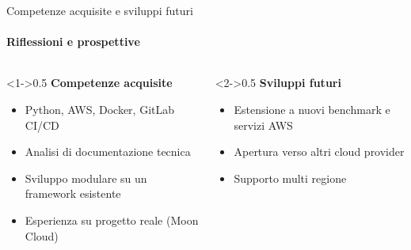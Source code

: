 \documentclass{beamer}
\begin{document}
\begin{frame}{Competenze acquisite e sviluppi futuri}
    \framesubtitle{Riflessioni e prospettive}
    \begin{columns}
        \begin{column}<1->{0.5\textwidth}
            \textbf{Competenze acquisite}
            \begin{itemize}
                \item Python, AWS, Docker, GitLab CI/CD                \item Analisi di documentazione tecnica
                \item Sviluppo modulare su un framework esistente
                \item Esperienza su progetto reale (Moon Cloud)
            \end{itemize}
        \end{column}
        \begin{column}<2->{0.5\textwidth}
            \textbf{Sviluppi futuri}
            \begin{itemize}
                \item Estensione a nuovi benchmark e servizi AWS
                \item Apertura verso altri cloud provider
                \item Supporto multi regione
            \end{itemize}
        \end{column}
    \end{columns}
\end{frame}




\backmatter
\end{document}
